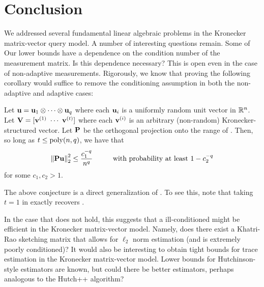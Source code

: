 
\section{Conclusion}
We addressed several fundamental linear algebraic problems in the Kronecker matrix-vector query model.
A number of interesting questions remain.
Some of Our lower bounds have a dependence on the condition number of the measurement matrix.
Is this dependence necessary?
This is open even in the case of non-adaptive measurements.
Rigorously, we know that proving the following corollary would suffice to remove the conditioning assumption in both the non-adaptive and adaptive cases:
\begin{conjecture}
    \label{conj:kron-unit-concentration}
    Let \(\boldsymbol{\mathrm{u}} = \boldsymbol{\mathrm{u}}_1 \otimes \cdots \otimes \boldsymbol{\mathrm{u}}_q\) where each \(\boldsymbol{\mathrm{u}}_i\) is a uniformly random unit vector in \({\mathbb R}^{n}\).
    Let \(\mathbf{V} = [\boldsymbol{\mathrm{v}}^{(1)} ~ \cdots ~ \boldsymbol{\mathrm{v}}^{(t)}]\) where each \(\boldsymbol{\mathrm{v}}^{(i)}\) is an arbitrary (non-random) Kronecker-structured vector.
    Let \(\mathbf{P}\) be the orthogonal projection onto the range of \mV.
    Then, so long as \(t \leq \operatorname{poly}(n,q)\), we have that
    \[
        \norm{\mP\vu}_2^2 \leq \frac{c_1^{-q}}{n^q}
        \hspace{1cm}
        \text{with probability at least }
        1-c_2^{-q}
    \]
    for some \(c_1,c_2 > 1\).
\end{conjecture}
The above conjecture is a direct generalization of .
To see this, note that taking \(t=1\) in  exactly recovers .

In the case that  does not hold, this suggests that a ill-conditioned might be efficient in the Kronecker matrix-vector model.
Namely, does there exist a Khatri-Rao sketching matrix that allows for $\ell_2$ norm estimation (and is extremely poorly conditioned)?
It would also be interesting to obtain tight bounds for trace estimation in the Kronecker matrix-vector model.
Lower bounds for Hutchinson-style estimators are known, but could there be better estimators, perhaps analogous to the Hutch++ \cite{meyer21hutchpp} algorithm?
